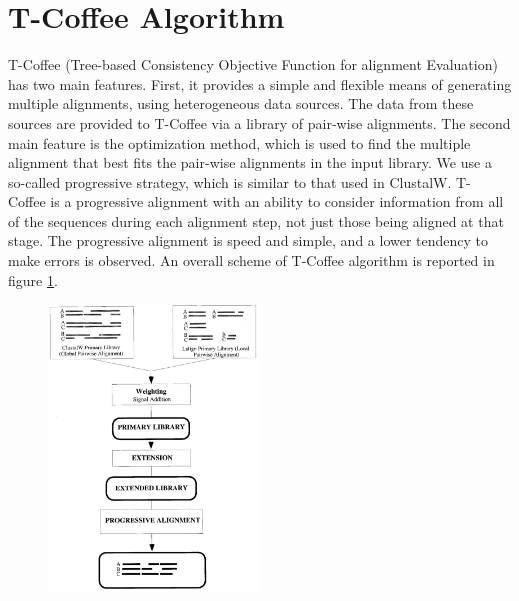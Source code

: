 \section{T-Coffee Algorithm}
T-Coffee (Tree-based Consistency Objective Function for alignment Evaluation) has two main features. First, it provides a simple and flexible means of generating multiple alignments, using heterogeneous data sources. The data from these sources are provided to T-Coffee via a library of pair-wise alignments.
The second main feature is the optimization method, which is used to find the multiple alignment that best fits the pair-wise alignments in the input library. We use a so-called progressive strategy, which is similar to that used in ClustalW. T- Coffee is a progressive alignment with an ability to consider information from all of the sequences during each alignment step, not just those being aligned at that stage. The progressive alignment is speed and simple, and a lower tendency to make errors is observed.
An overall scheme of T-Coffee algorithm is reported in figure \ref{fig:tcoffee}.

\begin{figure}[ht]
		\centering
		\includegraphics[width=0.5\textwidth]{tcoffee}
		\caption{\label{fig:tcoffee}}
	\end{figure}

